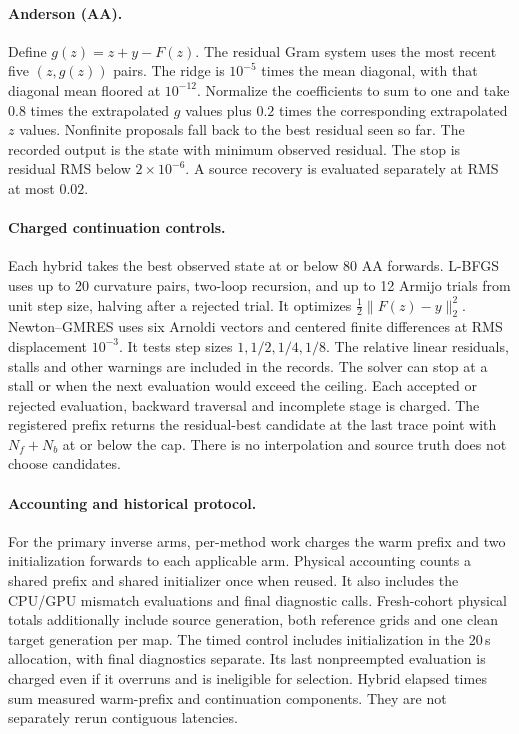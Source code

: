 \documentclass[10pt,twocolumn,letterpaper]{article}
\begin{document}
\paragraph{Anderson (AA).}
Define $g(z)=z+y-F(z)$. The residual Gram system uses the most recent five $(z,g(z))$ pairs. The ridge is $10^{-5}$ times the mean diagonal, with that diagonal mean floored at $10^{-12}$. Normalize the coefficients to sum to one and take $0.8$ times the extrapolated $g$ values plus $0.2$ times the corresponding extrapolated $z$ values. Nonfinite proposals fall back to the best residual seen so far. The recorded output is the state with minimum observed residual. The stop is residual RMS below $2\times10^{-6}$. A source recovery is evaluated separately at RMS at most $0.02$.

\paragraph{Charged continuation controls.}
Each hybrid takes the best observed state at or below 80 AA forwards. L-BFGS uses up to 20 curvature pairs, two-loop recursion, and up to 12 Armijo trials from unit step size, halving after a rejected trial. It optimizes $\frac12\|F(z)-y\|_2^2$. Newton--GMRES uses six Arnoldi vectors and centered finite differences at RMS displacement $10^{-3}$. It tests step sizes $1,1/2,1/4,1/8$. The relative linear residuals, stalls and other warnings are included in the records. The solver can stop at a stall or when the next evaluation would exceed the ceiling. Each accepted or rejected evaluation, backward traversal and incomplete stage is charged. The registered prefix returns the residual-best candidate at the last trace point with $N_f+N_b$ at or below the cap. There is no interpolation and source truth does not choose candidates.

\paragraph{Accounting and historical protocol.}
For the primary inverse arms, per-method work charges the warm prefix and two initialization forwards to each applicable arm. Physical accounting counts a shared prefix and shared initializer once when reused. It also includes the CPU/GPU mismatch evaluations and final diagnostic calls. Fresh-cohort physical totals additionally include source generation, both reference grids and one clean target generation per map. The timed control includes initialization in the 20\,s allocation, with final diagnostics separate. Its last nonpreempted evaluation is charged even if it overruns and is ineligible for selection. Hybrid elapsed times sum measured warm-prefix and continuation components. They are not separately rerun contiguous latencies.
\end{document}
